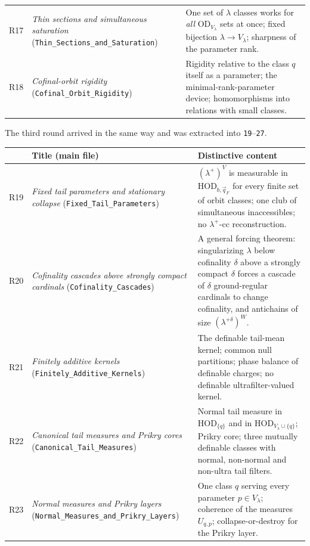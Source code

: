 \documentclass[11pt,letterpaper]{article}
\theoremstyle{definition}
\numberwithin{equation}{section}
\newcommand{\HOD}{\mathrm{HOD}}
\newcommand{\OD}{\mathrm{OD}}
\newcommand{\R}[1]{\textsf{R#1}}
\begin{document}
\begin{center}
\begin{tabularx}{\textwidth}{@{}lP{.33\textwidth}Y@{}}
\R{17}&\emph{Thin sections and simultaneous saturation} (\nolinkurl{Thin_Sections_and_Saturation})&One set of $\lambda$ classes works for \emph{all} $\OD_{V_\lambda}$ sets at once; fixed bijection $\lambda\to V_\lambda$; sharpness of the parameter rank.\\
\R{18}&\emph{Cofinal-orbit rigidity} (\nolinkurl{Cofinal_Orbit_Rigidity})&Rigidity relative to the class $q$ itself as a parameter; the minimal-rank-parameter device; homomorphisms into relations with small classes.\\
\bottomrule
\end{tabularx}
\end{center}

The third round arrived in the same way and was extracted into \nolinkurl{19}--\nolinkurl{27}.

\begin{center}
\small
\renewcommand{\arraystretch}{1.18}
\begin{tabularx}{\textwidth}{@{}lP{.33\textwidth}Y@{}}
\toprule
&\textbf{Title (main file)}&\textbf{Distinctive content}\\\midrule
\R{19}&\emph{Fixed tail parameters and stationary collapse} (\nolinkurl{Fixed_Tail_Parameters})&$(\lambda^+)^V$ is measurable in $\HOD_{b,\vec q_F}$ for every finite set of orbit classes; one club of simultaneous inaccessibles; no $\lambda^+$-cc reconstruction.\\
\R{20}&\emph{Cofinality cascades above strongly compact cardinals} (\nolinkurl{Cofinality_Cascades})&A general forcing theorem: singularizing $\lambda$ below cofinality $\delta$ above a strongly compact $\delta$ forces a cascade of $\delta$ ground-regular cardinals to change cofinality, and antichains of size $(\lambda^{+\delta})^W$.\\
\R{21}&\emph{Finitely additive kernels} (\nolinkurl{Finitely_Additive_Kernels})&The definable tail-mean kernel; common null partitions; phase balance of definable charges; no definable ultrafilter-valued kernel.\\
\R{22}&\emph{Canonical tail measures and Prikry cores} (\nolinkurl{Canonical_Tail_Measures})&Normal tail measure in $\HOD_{\{q\}}$ and in $\HOD_{V_\lambda\cup\{q\}}$; Prikry core; three mutually definable classes with normal, non-normal and non-ultra tail filters.\\
\R{23}&\emph{Normal measures and Prikry layers} (\nolinkurl{Normal_Measures_and_Prikry_Layers})&One class $q$ serving every parameter $p\in V_\lambda$; coherence of the measures $U_{q,p}$; collapse-or-destroy for the Prikry layer.\\

\end{tabularx}
\end{center}
\end{document}
